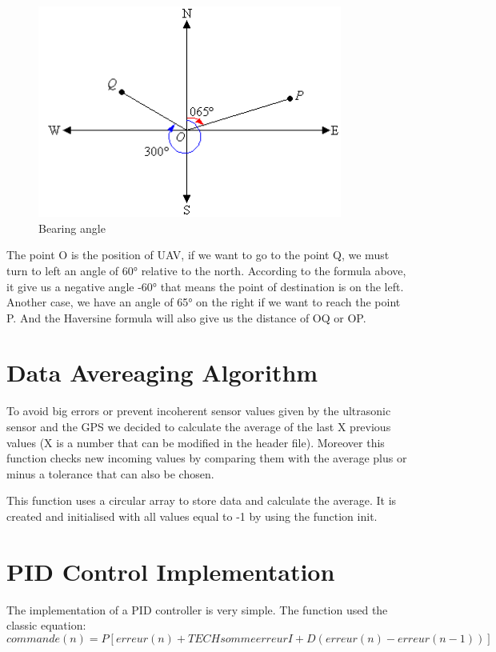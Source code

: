 \begin{figure}[!h] 
\begin{center}
\includegraphics[width=10cm]{imgs/img.png}
\caption{Bearing angle} 
\label{img1} 
\end{center}
\end{figure} 

The point O is the position of UAV, if we want to go to the point Q, we must turn to left an angle of 60° relative to the north. According to the formula above, it give us a negative angle -60° that means the point of destination is on the left. Another case, we have an angle of 65° on the right if we want to reach the point P.
And the Haversine formula will also give us the distance of OQ or OP.

\section{Data Avereaging Algorithm}

To avoid big errors or prevent incoherent sensor values given by the ultrasonic sensor and the GPS we decided to calculate the average of the last X previous values (X is a number that can be modified in the header file). Moreover this function checks new incoming values by comparing them with the average plus or minus a tolerance that can also be chosen.

This function uses a circular array to store data and calculate the average. It is created and initialised with all values equal to -1 by using the function init.

\section{PID Control Implementation}
The implementation of a PID controller is very simple. The function used the classic equation:
\begin{equation}
commande(n) = P[erreur(n)+TECHsommeerreurI+D(erreur(n)-erreur(n-1))]
\end{equation}

